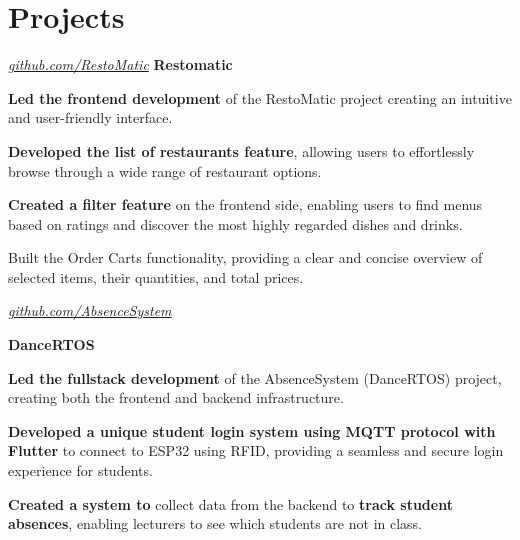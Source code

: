 \documentclass[../main.tex]{subfiles}
\begin{document}
     \section{Projects}


        \begin{twocolentry}{
           \small 
        \textit{\href{https://github.com/SistemBasisData2023/RestoMatic}{github.com/RestoMatic}}}
            \textbf{Restomatic}
        \end{twocolentry}

        \vspace{0.10 cm}
        \begin{onecolentry}
            \begin{highlights}
            \item \textbf{Led the frontend development} of the RestoMatic project creating an intuitive and user-friendly interface.
            \item \textbf{Developed the list of restaurants feature}, allowing users to effortlessly browse through a wide range of restaurant options.
            \item \textbf{Created a filter feature} on the frontend side, enabling users to find menus based on ratings and discover the most highly regarded dishes and drinks.
            \item Built the Order Carts functionality, providing a clear and concise overview of selected items, their quantities, and total prices.
            \end{highlights}
        \end{onecolentry}


        \vspace{0.2 cm}

        \begin{twocolentry}{
        \small 

        \textit{\href{https://github.com/cattyman919/AbsenceSystem/tree/main}{github.com/AbsenceSystem}}}
            \textbf{DanceRTOS}
        \end{twocolentry}

        \vspace{0.10 cm}
        \begin{onecolentry}
            \begin{highlights}
            \item \textbf{Led the fullstack development} of the AbsenceSystem (DanceRTOS) project, creating both the frontend and backend infrastructure.
            \item \textbf{Developed a unique student login system using MQTT protocol with Flutter} to connect to ESP32 using RFID, providing a seamless and secure login experience for students.
            \item \textbf{Created a system to} collect data from the backend to \textbf{track student absences}, enabling lecturers to see which students are not in class.
            \end{highlights}
        \end{onecolentry}
\end{document}

